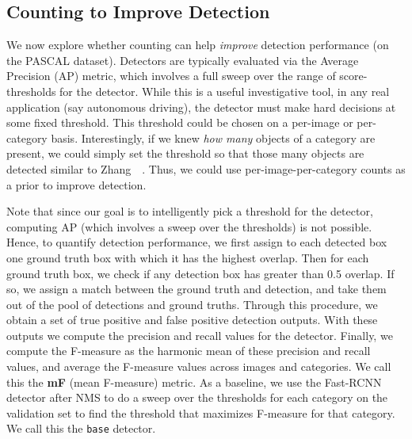 \documentclass[10pt,twocolumn,letterpaper]{article}
\begin{document}
\subsection{Counting to Improve Detection}\label{subsec:cntdet}
We now explore whether counting can help \emph{improve} detection performance (on the PASCAL dataset). Detectors are typically evaluated via the Average Precision (AP) metric, which involves a full sweep over the range of score-thresholds for the detector. While this is a useful investigative tool, in any real application (say autonomous driving), the detector must make hard decisions at some fixed threshold. This threshold could be chosen on a per-image or per-category basis. Interestingly, if we knew \emph{how many} objects of a category are present, we could simply set the threshold so that those many objects are detected similar to Zhang~\etal~\cite{zhang2015salient}. Thus, we could use per-image-per-category counts as a prior to improve detection. 

Note that since our goal is to intelligently pick a threshold for the detector, computing AP (which involves a sweep over the thresholds) is not possible. Hence, to quantify detection performance, we first assign to each detected box one ground truth box with which it has the highest overlap. Then for each ground truth box, we check if any detection box has greater than 0.5 overlap. If so, we assign a match between the ground truth and detection, and take them out of the pool of detections and ground truths. Through this procedure, we obtain a set of true positive and false positive detection outputs. With these outputs we compute the precision and recall values for the detector. Finally, we compute the F-measure as the harmonic mean of these precision and recall values, and average the F-measure values across images and categories. We call this the \textbf{mF} (mean F-measure) metric. As a baseline, we use the Fast-RCNN detector after NMS to do a sweep over the thresholds for each category on the validation set to find the threshold that maximizes F-measure for that category. We call this the \texttt{base} detector.
\end{document}
